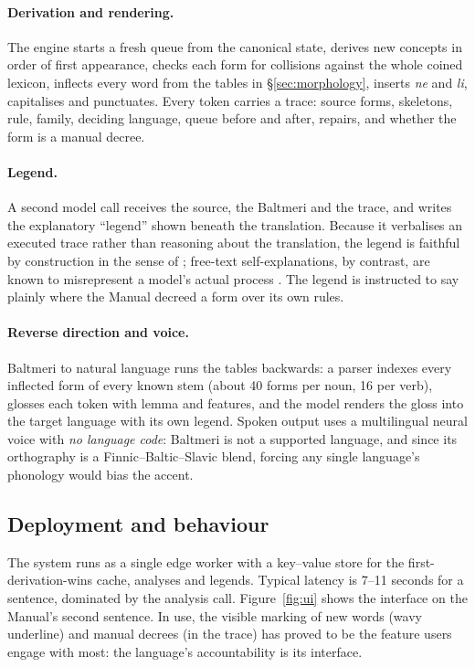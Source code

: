 \paragraph{Derivation and rendering.} The engine starts a fresh queue from the canonical state, derives new concepts in order of first appearance, checks each form for collisions against the whole coined lexicon, inflects every word from the tables in \S\ref{sec:morphology}, inserts \emph{ne} and \emph{li}, capitalises and punctuates. Every token carries a trace: source forms, skeletons, rule, family, deciding language, queue before and after, repairs, and whether the form is a manual decree.

\paragraph{Legend.} A second model call receives the source, the Baltmeri and the trace, and writes the explanatory ``legend'' shown beneath the translation. Because it verbalises an executed trace rather than reasoning about the translation, the legend is faithful by construction in the sense of \citet{jacovi2020}; free-text self-explanations, by contrast, are known to misrepresent a model's actual process \citep{turpin2023}. The legend is instructed to say plainly where the Manual decreed a form over its own rules.

\paragraph{Reverse direction and voice.} Baltmeri to natural language runs the tables backwards: a parser indexes every inflected form of every known stem (about 40 forms per noun, 16 per verb), glosses each token with lemma and features, and the model renders the gloss into the target language with its own legend. Spoken output uses a multilingual neural voice with \emph{no language code}: Baltmeri is not a supported language, and since its orthography is a Finnic--Baltic--Slavic blend, forcing any single language's phonology would bias the accent.

\subsection{Deployment and behaviour}
The system runs as a single edge worker with a key--value store for the first-derivation-wins cache, analyses and legends. Typical latency is 7--11 seconds for a sentence, dominated by the analysis call. Figure~\ref{fig:ui} shows the interface on the Manual's second sentence. In use, the visible marking of new words (wavy underline) and manual decrees (in the trace) has proved to be the feature users engage with most: the language's accountability is its interface.

